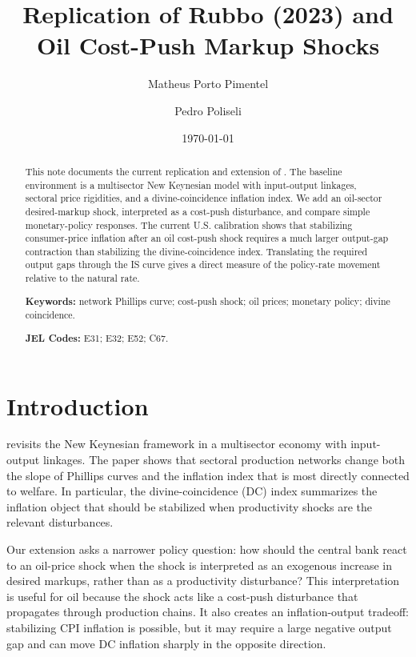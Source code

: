 \documentclass[12pt]{article}
\title{Replication of Rubbo (2023) and Oil Cost-Push Markup Shocks}
\author{Matheus Porto Pimentel \and Pedro Poliseli}
\date{\today}
\begin{document}
\maketitle

\begin{abstract}
\noindent
This note documents the current replication and extension of \citet{rubbo2023networks}.
The baseline environment is a multisector New Keynesian model with input-output
linkages, sectoral price rigidities, and a divine-coincidence inflation index. We add
an oil-sector desired-markup shock, interpreted as a cost-push disturbance, and compare
simple monetary-policy responses. The current U.S. calibration shows that stabilizing
consumer-price inflation after an oil cost-push shock requires a much larger output-gap
contraction than stabilizing the divine-coincidence index. Translating the required
output gaps through the IS curve gives a direct measure of the policy-rate movement
relative to the natural rate.

\bigskip
\noindent\textbf{Keywords:} network Phillips curve; cost-push shock; oil prices;
monetary policy; divine coincidence.

\noindent\textbf{JEL Codes:} E31; E32; E52; C67.
\end{abstract}

\onehalfspacing

\section{Introduction}
\label{sec:introduction}

\citet{rubbo2023networks} revisits the New Keynesian framework in a multisector
economy with input-output linkages. The paper shows that sectoral production networks
change both the slope of Phillips curves and the inflation index that is most directly
connected to welfare. In particular, the divine-coincidence (DC) index summarizes the
inflation object that should be stabilized when productivity shocks are the relevant
disturbances.

Our extension asks a narrower policy question: how should the central bank react to an
oil-price shock when the shock is interpreted as an exogenous increase in desired
markups, rather than as a productivity disturbance? This interpretation is useful for
oil because the shock acts like a cost-push disturbance that propagates through
production chains. It also creates an inflation-output tradeoff: stabilizing CPI
inflation is possible, but it may require a large negative output gap and can move DC
inflation sharply in the opposite direction.
\end{document}
